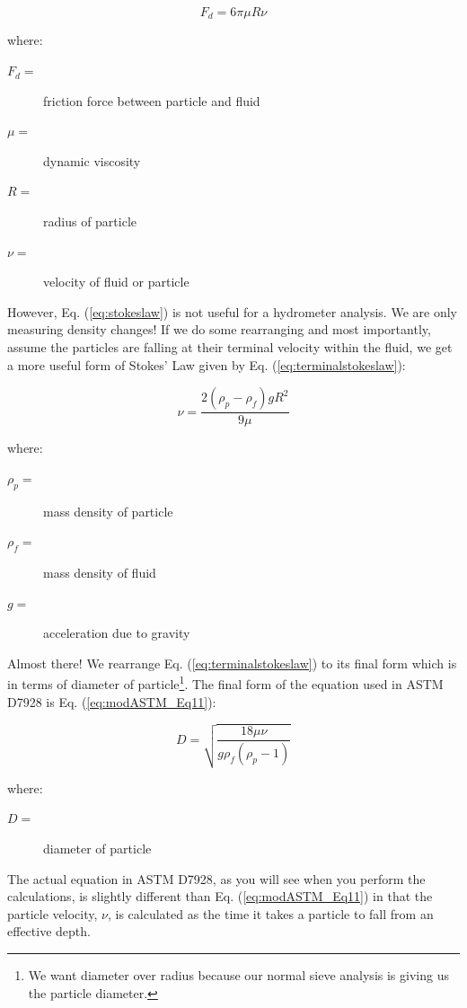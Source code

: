 \documentclass[12pt]{article}
\begin{document}
\begin{equation}
    F_d=6\pi\mu R\nu
    \label{eq:stokeslaw}
\end{equation}

where:
\begin{description}
\item[$F_d=$] friction force between particle and fluid
\item[$\mu=$] dynamic viscosity
\item[$R=$] radius of particle
\item[$\nu=$] velocity of fluid or particle
\end{description}
However, Eq. (\ref{eq:stokeslaw}) is not useful for a hydrometer analysis. We are only measuring density changes! If we do some rearranging and most importantly, assume the particles are falling at their terminal velocity within the fluid, we get a more useful form of Stokes' Law given by Eq. (\ref{eq:terminalstokeslaw}):

\begin{equation}
    \nu=\dfrac{2\left(\rho_p-\rho_f\right)gR^2}{9\mu}
    \label{eq:terminalstokeslaw}
\end{equation}

where:
\begin{description}
\item[$\rho_p=$] mass density of particle
\item[$\rho_f=$] mass density of fluid
\item[$g=$] acceleration due to gravity
\end{description}
Almost there! We rearrange Eq. (\ref{eq:terminalstokeslaw}) to its final form which is in terms of diameter of particle\footnote{We want diameter over radius because our normal sieve analysis is giving us the particle diameter.}. The final form of the equation used in ASTM D7928 is Eq. (\ref{eq:modASTM_Eq11}):

\begin{equation}
    D=\sqrt{\dfrac{18\mu\nu}{ g\rho_f\left(\rho_p-1\right)}}
    \label{eq:modASTM_Eq11}
\end{equation}

where:
\begin{description}
\item[$D=$] diameter of particle
\end{description}
The actual equation in ASTM D7928, as you will see when you perform the calculations, is slightly different than Eq. (\ref{eq:modASTM_Eq11}) in that the particle velocity, $\nu$, is calculated as the time it takes a particle to fall from an effective depth.
\end{document}
